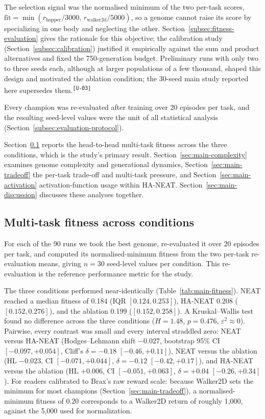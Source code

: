 \documentclass[12pt]{article}
\newcommand{\revID}[1]{\textsuperscript{\scriptsize\texttt{[#1]}}}
\newcommand{\revUnclear}[2]{\textcolor{revBlue}{#2}\revID{#1}}
\begin{document}
The selection signal was the normalised minimum of the two per-task scores, $\mathrm{fit} = \min(r_{\text{hopper}}/3000,\, r_{\text{walker2d}}/5000)$, so a genome cannot raise its score by specializing in one body and neglecting the other.
Section~\ref{subsec:fitness-evaluation} gives the rationale for this objective; the calibration study (Section~\ref{subsec:calibration}) justified it empirically against the sum and product alternatives and fixed the 750-generation budget.
\revUnclear{U-03}{Preliminary runs with only two to three seeds each, although at larger populations of a few thousand, shaped this design and motivated the ablation condition; the 30-seed main study reported here supersedes them.}

Every champion was re-evaluated after training over 20 episodes per task, and the resulting seed-level values were the unit of all statistical analysis (Section~\ref{subsec:evaluation-protocol}).

Section~\ref{sec:main-study} reports the head-to-head multi-task fitness across the three conditions, which is the study's primary result.
Section~\ref{sec:main-complexity} examines genome complexity and generational dynamics, Section~\ref{sec:main-tradeoff} the per-task trade-off and multi-task pressure, and Section~\ref{sec:main-activation} activation-function usage within HA-NEAT.
Section~\ref{sec:main-discussion} discusses these analyses together.

\subsection{Multi-task fitness across conditions}
\label{sec:main-study}
For each of the 90 runs we took the best genome, re-evaluated it over 20 episodes per task, and computed its normalised-minimum fitness from the two per-task re-evaluation means, giving $n = 30$ seed-level values per condition.
This re-evaluation is the reference performance metric for the study.

The three conditions performed near-identically (Table~\ref{tab:main-fitness}).
NEAT reached a median fitness of 0.184 (IQR $[0.124, 0.253]$), HA-NEAT 0.208 ($[0.152, 0.276]$), and the ablation 0.199 ($[0.152, 0.258]$).
A Kruskal--Wallis test found no difference across the three conditions ($H = 1.48$, $p = 0.476$, $\varepsilon^2 \approx 0$).
Pairwise, every contrast was small and every interval straddled zero: NEAT versus HA-NEAT (Hodges--Lehmann shift $-0.027$, bootstrap 95\% CI $[-0.097, +0.054]$, Cliff's $\delta = -0.18$ $[-0.46, +0.11]$), NEAT versus the ablation (HL $-0.023$, CI $[-0.071, +0.044]$, $\delta = -0.12$ $[-0.42, +0.17]$), and HA-NEAT versus the ablation (HL $+0.006$, CI $[-0.051, +0.063]$, $\delta = +0.04$ $[-0.26, +0.34]$).
For readers calibrated to Brax's raw reward scale: because Walker2D sets the minimum for most champions (Section~\ref{sec:main-tradeoff}), a normalised-minimum fitness of 0.20 corresponds to a Walker2D return of roughly 1{,}000, against the 5{,}000 used for normalization.
\end{document}
